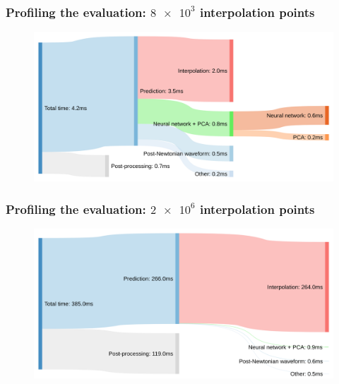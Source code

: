 \documentclass{beamer}
\begin{document}
\begin{frame}
    \frametitle{Profiling the evaluation: \(\num{8e3}\) interpolation points}
    \begin{figure}[ht]
    \centering
    \includegraphics[width=\textwidth]{figures/sankey_downsampled}
    \label{fig:sankey_downsampled}
    \end{figure}
\end{frame}

\begin{frame}
    \frametitle{Profiling the evaluation: \(\num{2e6}\) interpolation points}
    \begin{figure}[ht]
    \centering
    \includegraphics[width=\textwidth]{figures/sankey_full}
    \label{fig:sankey_full}
    \end{figure}
\end{frame}
\end{document}
